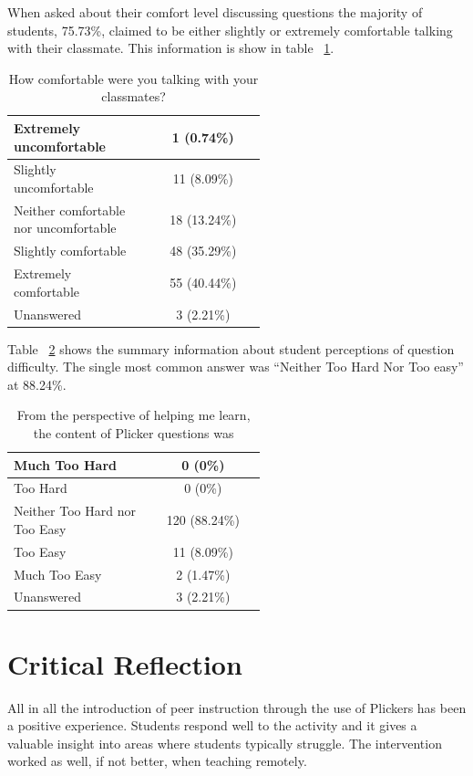 \documentclass{article}
\begin{document}
When asked about their comfort level discussing questions the majority of students, 75.73\%, claimed to be either slightly or extremely comfortable talking with their classmate. This information is show in table ~\ref{table:group_comfort}.

\begin{table}[ht]
\caption{How comfortable were you talking with your classmates?}
\begin{tabular}{p{0.55\linewidth}|c} %
\toprule
 \rowcolor{LightGray} 
 Extremely uncomfortable & 1 (0.74\%)\\\midrule 
 Slightly uncomfortable & 11 (8.09\%)\\\midrule 
 \rowcolor{LightGray}
 Neither comfortable nor uncomfortable & 18 (13.24\%)\\\midrule 
 Slightly comfortable & 48 (35.29\%)\\\midrule 
 \rowcolor{LightGray}
 Extremely comfortable & 55 (40.44\%)\\\midrule 
 Unanswered & 3 (2.21\%)\\\bottomrule 
\end{tabular}
\label{table:group_comfort}
\end{table}

Table ~\ref{table:questionDifficulty} shows the summary information about student perceptions of question difficulty. The single most common answer was ``Neither Too Hard Nor Too easy'' at 88.24\%. 

\begin{table}[ht]
\caption{From the perspective of helping me learn, the content of Plicker questions was}
\begin{tabular}{p{0.55\linewidth}|c} %
\toprule
 \rowcolor{LightGray} 
 Much Too Hard & 0 (0\%)\\\midrule 
 Too Hard & 0 (0\%)\\\midrule 
 \rowcolor{LightGray}
 Neither Too Hard nor Too Easy & 120 (88.24\%)\\\midrule 
 Too Easy & 11 (8.09\%)\\\midrule 
 \rowcolor{LightGray}
 Much Too Easy & 2 (1.47\%)\\\midrule 
 Unanswered & 3 (2.21\%)\\\bottomrule 
\end{tabular}
\label{table:questionDifficulty}
\end{table}

\section{Critical Reflection}
\balance
All in all the introduction of peer instruction through the use of Plickers has been a positive experience. Students respond well to the activity and it gives a valuable insight into areas where students typically struggle. The intervention worked as well, if not better, when teaching remotely. 
\end{document}
